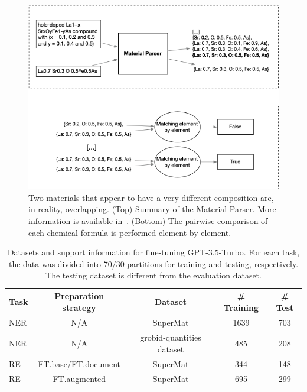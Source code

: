\begin{figure}[ht]
  \centering
  \includegraphics[width=1\textwidth]{figures/formula-matching-schema.png} 
  \caption{Two materials that appear to have a very different composition are, in reality, overlapping. (Top) Summary of the Material Parser. More information is available in~\cite{lfoppiano2023automatic}. (Bottom) The pairwise comparison of each chemical formula is performed element-by-element.  }
  \label{fig:formula-matching-schema}
\end{figure}


\begin{table}[htbp]
    \centering
    \caption{Datasets and support information for fine-tuning GPT-3.5-Turbo. For each task, the data was divided into 70/30 partitions for training and testing, respectively. The testing dataset is different from the evaluation dataset.  }
    \label{tab:amount-data-fine-tuned}
    \begin{tabular}{lcccc}
        \textbf{Task} & \textbf{Preparation strategy} & \textbf{Dataset} & \textbf{\# Training} & \textbf{\# Test} \\
        \toprule
        NER & N/A & SuperMat   & 1639 & 703 \\
        NER & N/A & grobid-quantities dataset & 485 & 208 \\
        RE  & FT.base/FT.document & SuperMat   & 344 & 148 \\
        RE  & FT.augmented & SuperMat & 695 & 299 \\
        \bottomrule
    \end{tabular}
\end{table}

